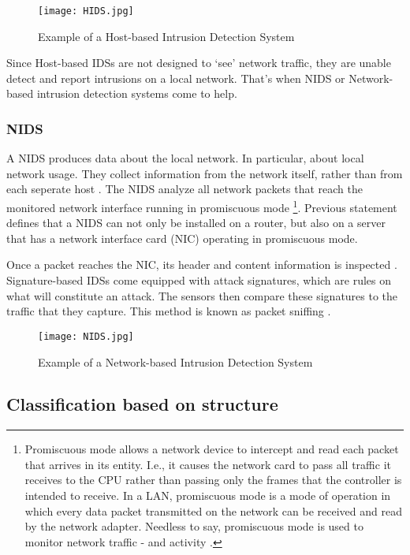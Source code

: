 \begin{figure}[h]
    \centering
    \texttt{[image: HIDS.jpg]}
    \caption{Example of a Host-based Intrusion Detection System}
    \label{fig:HIDS}
\end{figure}

Since Host-based IDSs are not designed to `see' network traffic, they are unable detect and report intrusions on a local network. That's when NIDS or Network-based intrusion detection systems come to help.

\subsubsection{NIDS}

A NIDS \label{subsub:NIDS} produces data about the local network. In particular, about local network usage. They collect information from the network itself, rather than from each seperate host \citep{Host2}. The NIDS analyze all network packets that reach the monitored network interface running in promiscuous mode \footnote{Promiscuous mode allows a network device to intercept and read each packet that arrives in its entity. I.e., it causes the network card to pass all traffic it receives to the CPU rather than passing only the frames that the controller is intended to receive. In a LAN, promiscuous mode is a mode of operation in which every data packet transmitted on the network can be received and read by the network adapter. Needless to say, promiscuous mode is used to monitor network traffic - and activity \citep{Prom}.}. Previous statement defines that a NIDS can not only be installed on a router, but also on a server that has a network interface card (NIC) operating in promiscuous mode.

Once a packet reaches the NIC, its header and content information is inspected \citep{Host2}. Signature-based IDSs come equipped with attack signatures, which are rules on what will constitute an attack. The sensors then compare these signatures to the traffic  that they capture. This method is known as packet sniffing \citep{Sniffing}.

\begin{figure}[h]
    \centering
    \texttt{[image: NIDS.jpg]}
    \caption{Example of a Network-based Intrusion Detection System}
    \label{fig:NIDS}
\end{figure}

\subsection{Classification based on structure}

